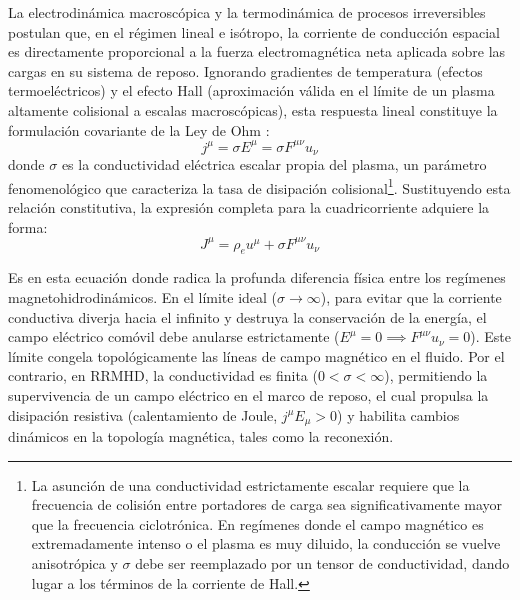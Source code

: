 \primerparrafo La electrodinámica macroscópica y la termodinámica de procesos irreversibles postulan que, en el régimen lineal e isótropo, la corriente de conducción espacial es directamente proporcional a la fuerza electromagnética neta aplicada sobre las cargas en su sistema de reposo. Ignorando gradientes de temperatura (efectos termoeléctricos) y el efecto Hall (aproximación válida en el límite de un plasma altamente colisional a escalas macroscópicas), esta respuesta lineal constituye la formulación covariante de la Ley de Ohm \parencite{komissarov-2007}:
\begin{equation}
    j^\mu = \sigma E^\mu = \sigma F^{\mu\nu}u_\nu
\end{equation}
donde $\sigma$ es la conductividad eléctrica escalar propia del plasma, un parámetro fenomenológico que caracteriza la tasa de disipación colisional\footnote{La asunción de una conductividad estrictamente escalar requiere que la frecuencia de colisión entre portadores de carga sea significativamente mayor que la frecuencia ciclotrónica. En regímenes donde el campo magnético es extremadamente intenso o el plasma es muy diluido, la conducción se vuelve anisotrópica y $\sigma$ debe ser reemplazado por un tensor de conductividad, dando lugar a los términos de la corriente de Hall.}. Sustituyendo esta relación constitutiva, la expresión completa para la cuadricorriente adquiere la forma:
\begin{equation}
    J^\mu = \rho_e u^\mu + \sigma F^{\mu\nu}u_\nu
\end{equation}

Es en esta ecuación donde radica la profunda diferencia física entre los regímenes magnetohidrodinámicos. En el límite ideal ($\sigma \rightarrow \infty$), para evitar que la corriente conductiva diverja hacia el infinito y destruya la conservación de la energía, el campo eléctrico comóvil debe anularse estrictamente ($E^\mu = 0 \implies F^{\mu\nu}u_\nu = 0$). Este límite congela topológicamente las líneas de campo magnético en el fluido. Por el contrario, en RRMHD, la conductividad es finita ($0 < \sigma < \infty$), permitiendo la supervivencia de un campo eléctrico en el marco de reposo, el cual propulsa la disipación resistiva (calentamiento de Joule, $j^\mu E_\mu > 0$) y habilita cambios dinámicos en la topología magnética, tales como la reconexión.

